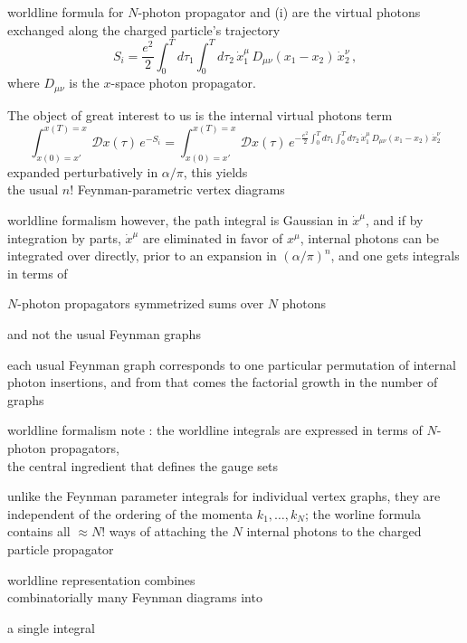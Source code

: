 \begin{frame}{worldline formula for $N$-photon propagator}
and (i) are the virtual photons exchanged along the charged particle's
trajectory
\[ %
S_i = \frac{e^2}{2}\int_0^T\!\!d\tau_1\int_0^T\!\!d\tau_2\,
      \dot{x}_1^\mu\,D_{\mu\nu}(x_1-x_2)\,\dot{x}_2^\nu
\,,
\] %
where $D_{\mu\nu} $ is the $x$-space photon propagator.

\medskip
The object of great interest to us is the internal virtual
photons term
\[ %
\int_{x(0)=x'}^{x(T)=x}\!\!\mathcal{D}x(\tau)\,
            {e}^{-S_i}
=
\int_{x(0)=x'}^{x(T)=x}\!\!\mathcal{D}x(\tau)\,
            {e}^{-\frac{e^2}{2}\int_0^T\!\!d\tau_1\int_0^T\!\!d\tau_2\,
      \dot{x}_1^\mu\,D_{\mu\nu}(x_1-x_2)\,\dot{x}_2^\nu}
\] %
expanded perturbatively in $\alpha/\pi$, this yields \\
the
usual $n!$ Feynman-parametric vertex diagrams
\end{frame}

\begin{frame}{worldline formalism}
however, the path integral is Gaussian in
$\dot{x}^\mu$, and if by integration by parts, $\dot{x}^\mu$ are
eliminated in favor of $x^\mu$, internal photons can be integrated over
directly, prior to an expansion in $(\alpha/\pi)^n$, and one gets
integrals in terms of

\begin{block}{$N$-photon propagators}
symmetrized sums over $N$ photons
\end{block}
and not the usual
Feynman graphs

\bigskip
each usual Feynman graph corresponds to one particular
permutation of internal photon insertions, and from that comes the
factorial growth in the number of graphs
\end{frame}

\begin{frame}{worldline formalism}
note : the worldline integrals are expressed
in terms of $N$-photon propagators, \\
the central ingredient that defines
the \textcolor{red!80!black}{gauge sets}

\bigskip
unlike the Feynman parameter integrals for individual vertex graphs, they are
independent of the ordering of the momenta $k_1,\ldots,k_N$; the worline formula
contains all $\approx N!$ ways of attaching the $N$ internal
photons to the charged particle propagator

\bigskip
worldline representation combines
\\
\textcolor{green!80!black}{combinatorially many} Feynman diagrams into

\medskip\hfill
a \textcolor{green!80!black}{{\Huge single}} integral

\end{frame}

